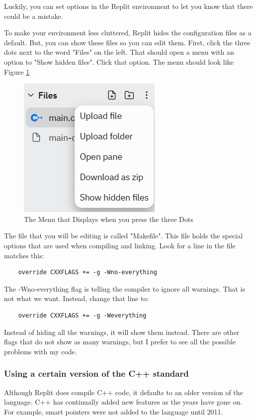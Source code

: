 Luckily, you can set options in the Replit environment to let you know that there could be a mistake.

To make your environment less cluttered, Replit hides the configuration files as a default. But, you can show these files so you can edit them. First, click the three dots next to the word "Files" on the left. That should open a menu with an option to "Show hidden files". Click that option. The menu should look like Figure \ref{fig:ShowHiddenMenu}

\begin{figure}[h]
    \centering
    \includegraphics{images/showhidden.PNG}
    \caption{The Menu that Displays when you press the three Dots}
    \label{fig:ShowHiddenMenu}
\end{figure}

The file that you will be editing is called "Makefile". This file holds the special options that are used when compiling and linking. Look for a line in the file matches this:

\begin{verbatim}
    override CXXFLAGS += -g -Wno-everything    
\end{verbatim}

The -Wno-everything flag is telling the compiler to ignore all warnings. That is not what we want. Instead, change that line to:

\begin{verbatim}
    override CXXFLAGS += -g -Weverything
\end{verbatim}

Instead of hiding all the warnings, it will show them instead. There are other flags that do not show as many warnings, but I prefer to see all the possible problems with my code.

\subsubsection{Using a certain version of the C++ standard}
\label{changestandard}
Although Replit does compile C++ code, it defaults to an older version of the language. C++ has continually added new features as the years have gone on. For example, smart pointers were not added to the language until 2011.

